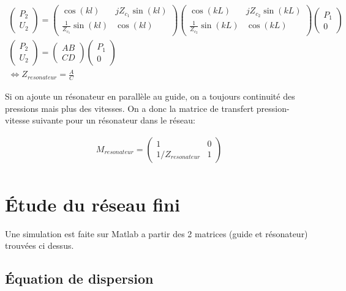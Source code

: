 \documentclass[a4paper]{report}
\begin{document}
\begin{eqnarray*}
\begin{pmatrix} P_2 \\U_2 \end{pmatrix} = \begin{pmatrix} \cos(k l) & j Z_{c_1} \sin(k l) \\ \frac{1}{Z_{c_1}} \sin(k l) & \cos(k l) \end{pmatrix} \begin{pmatrix} \cos(k L) & j Z_{c_2} \sin(k L) \\ \frac{1}{Z_{c_2}} \sin(k L) & \cos(k L) \end{pmatrix} \begin{pmatrix} P_1 \\ 0  \end{pmatrix} \\
\begin{pmatrix} P_2 \\U_2 \end{pmatrix} = \begin{pmatrix} A B \\ C D \end{pmatrix} \begin{pmatrix} P_1 \\ 0  \end{pmatrix} \\
\Leftrightarrow Z_{resonateur} = \frac{A}{C}
\end{eqnarray*}


Si on ajoute un résonateur en parallèle au guide, on a toujours continuité des pressions mais plus des vitesses. On a donc la matrice de transfert pression-vitesse suivante pour un résonateur dans le réseau:

\begin{eqnarray*}
M_{resonateur} = \begin{pmatrix} 1 &  0 \\ 1 /Z_{resonateur} & 1  \end{pmatrix}\\
\end{eqnarray*}


\section{Étude du réseau fini}
Une simulation est faite sur Matlab a partir des 2 matrices (guide et résonateur) trouvées ci dessus.

\subsection{Équation de dispersion}
\end{document}
